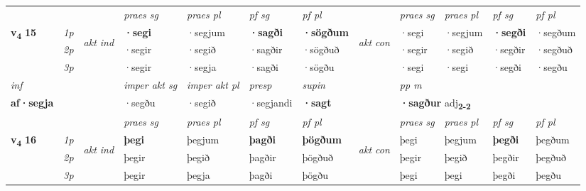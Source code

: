 \begin{longtable}[l]{X>{\footnotesize\itshape}llXXXXlXXXX}
 & &   & \textit{praes sg}  & \textit{praes pl}    & \textit{ pf sg} & \textit{pf pl} & & \textit{praes sg}  & \textit{praes pl}    & \textit{pf sg} & \textit{pf pl }  \\ \cmidrule{4-7} \cmidrule{9-12}
 \multirow{2}{*}{{{\textbf{v{\textsubscript{4}}} \Large{\textbf{15}}}}}  & 1p & \multirow{3}{*}{\begin{turn}{90}\textit{akt ind}\end{turn}} & \textbf{·segi} & ·segjum & \textbf{·sagði} & \textbf{·sögðum} & \multirow{3}{*}{\begin{turn}{90}\textit{akt con}\end{turn}} &·segi & ·segjum & \textbf{·segði} & ·segðum\\*
 & 2p &  &  ·segir  & ·segið & ·sagðir & ·sögðuð & & ·segir & ·segið & ·segðir & ·segðuð \\*
 & 3p &  & ·segir & ·segja & ·sagði & ·sögðu & & ·segi & ·segi& ·segði & ·segðu \\*
\cmidrule{4-7} \cmidrule{9-12}

   {\textit{inf}} & &  & \textit{imper akt sg} & \textit{imper akt pl}   & \textit{presp} & \textit{supin}  && \textit{pp m} \\*
  {\textbf{af\allowbreak ·segja}} & && ·segðu  & ·segið   & ·segjandi &  \textbf{·sagt}  && \multicolumn{2}{l}{\textbf{·sagður} adj\textbf{\textsubscript{2-2}}} \\*

\midrule

 & &   & \textit{praes sg}  & \textit{praes pl}    & \textit{ pf sg} & \textit{pf pl} & & \textit{praes sg}  & \textit{praes pl}    & \textit{pf sg} & \textit{pf pl }  \\ \cmidrule{4-7} \cmidrule{9-12}
 \multirow{2}{*}{{{\textbf{v{\textsubscript{4}}} \Large{\textbf{16}}}}}  & 1p & \multirow{3}{*}{\begin{turn}{90}\textit{akt ind}\end{turn}} & \textbf{þegi} & þegjum & \textbf{þagði} & \textbf{þögðum} & \multirow{3}{*}{\begin{turn}{90}\textit{akt con}\end{turn}} &þegi & þegjum & \textbf{þegði} & þegðum\\*
 & 2p &  &  þegir  & þegið & þagðir & þögðuð & & þegir & þegið & þegðir & þegðuð \\*
 & 3p &  & þegir & þegja & þagði & þögðu & & þegi & þegi& þegði & þegðu \\*
\cmidrule{4-7} \cmidrule{9-12}


\end{longtable}
